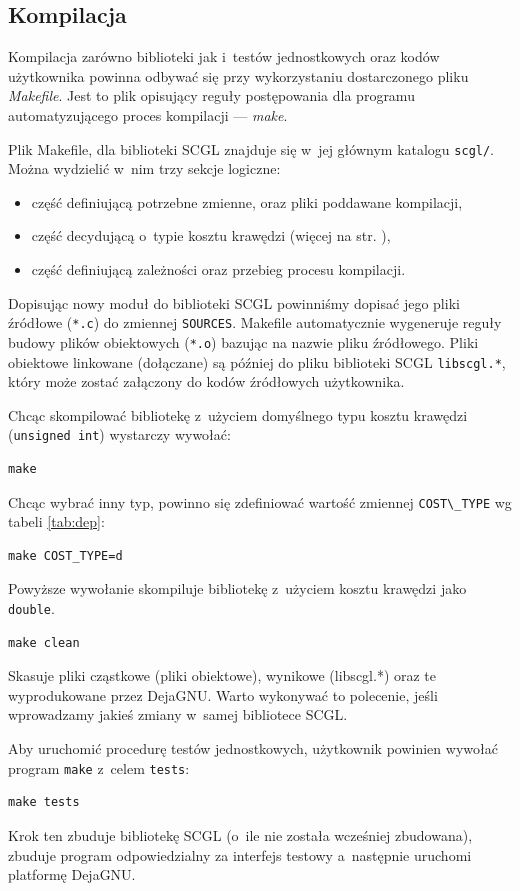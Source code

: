 \documentclass[a4paper,12pt,polish,twoside,openright]{thesis}
\newcommand\code[1]{\lstinline[style=line]{#1}}
\begin{document}
\subsection{Kompilacja}
\label{chap:make}
Kompilacja zarówno biblioteki jak i~testów jednostkowych oraz kodów użytkownika powinna odbywać się przy wykorzystaniu dostarczonego pliku \emph{Makefile}.
Jest to plik opisujący reguły postępowania dla programu automatyzującego proces kompilacji --- \emph{make}.

Plik Makefile, dla biblioteki SCGL znajduje się w~jej głównym katalogu \code{scgl/}.
Można wydzielić w~nim trzy sekcje logiczne:
\begin{itemize}
	\item część definiującą potrzebne zmienne, oraz pliki poddawane kompilacji,
	\item część decydującą o~typie kosztu krawędzi (więcej na str. \pageref{chap:costtype}),
	\item część definiującą zależności oraz przebieg procesu kompilacji.
\end{itemize}
Dopisując nowy moduł do biblioteki SCGL powinniśmy dopisać jego pliki źródłowe (\code{*.c}) do zmiennej \code{SOURCES}.
Makefile automatycznie wygeneruje reguły budowy plików obiektowych (\code{*.o}) bazując na nazwie pliku źródłowego.
Pliki obiektowe linkowane (dołączane) są później do pliku biblioteki SCGL \code{libscgl.*}, który może zostać załączony do kodów źródłowych użytkownika.

Chcąc skompilować bibliotekę z~użyciem domyślnego typu kosztu krawędzi (\code{unsigned int}) wystarczy wywołać:
\begin{lstlisting}[style=coden]
make
\end{lstlisting}
Chcąc wybrać inny typ, powinno się zdefiniować wartość zmiennej \code{COST\_TYPE} wg tabeli \ref{tab:dep}:
\begin{lstlisting}[style=coden]
make COST_TYPE=d
\end{lstlisting}
Powyższe wywołanie skompiluje bibliotekę z~użyciem kosztu krawędzi jako \code{double}.

\begin{lstlisting}[style=coden]
make clean
\end{lstlisting}
Skasuje pliki cząstkowe (pliki obiektowe), wynikowe (libscgl.*) oraz te wyprodukowane przez DejaGNU.
Warto wykonywać to polecenie, jeśli wprowadzamy jakieś zmiany w~samej bibliotece SCGL.

Aby uruchomić procedurę testów jednostkowych, użytkownik powinien wywołać program \code{make} z~celem \code{tests}:
\begin{lstlisting}[style=coden]
make tests
\end{lstlisting}
Krok ten zbuduje bibliotekę SCGL (o~ile nie została wcześniej zbudowana), zbuduje program odpowiedzialny za interfejs testowy a~następnie uruchomi platformę DejaGNU.
\end{document}
